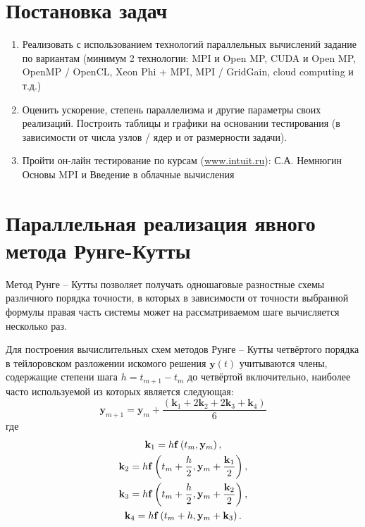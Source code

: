 \documentclass[14pt,final,titlepage,pscyr]{hedwork}
\renewcommand{\vec}[1]{\mathbf{#1}}
\begin{document}
\maketitle
\tableofcontents
\section{Постановка задач}
	\begin{enumerate}
		\item Реализовать с использованием технологий параллельных вычислений задание по вариантам 
			(минимум 2 технологии: MPI и Open MP, CUDA и Open MP, OpenMP / OpenCL, Xeon Phi + MPI, 
			MPI / GridGain, cloud computing и т.д.)
		\item Оценить ускорение, степень параллелизма и другие параметры своих реализаций. Построить 
			таблицы и графики на основании тестирования (в зависимости от числа узлов / ядер и от 
			размерности задачи).
		\item Пройти он-лайн тестирование по курсам (\url{www.intuit.ru}): С.А. Немнюгин Основы MPI и 
			Введение в облачные вычисления 
	\end{enumerate}
\section{Параллельная реализация явного метода Рунге-Кутты}
	Метод Рунге -- Кутты позволяет получать одношаговые разностные схемы различного порядка точности, в 
	которых в зависимости от точности выбранной формулы правая часть системы может на рассматриваемом шаге 
	вычисляется несколько раз.

	Для построения вычислительных схем методов Рунге -- Кутты четвёртого порядка в тейлоровском разложении 
	искомого решения \( \vec{y}(t) \) учитываются члены, содержащие степени шага \( h = t_{m+1} - t_m \) до 
	четвёртой включительно, наиболее часто используемой из которых является следующая:
	\begin{equation}
		\vec{y}_{m+1} = \vec{y}_m + \frac{\left( \vec{k}_1 + 2\vec{k}_2 + 2\vec{k}_3 + \vec{k}_4 \right)}{6}
		\label{eq8.9}
	\end{equation}
	где 
	\begin{gather}
		\vec{k}_1 = h\vec{f}\left(t_m, \vec{y}_m \right), \notag \\
		\vec{k}_2 = h\vec{f}\left(t_m + \frac{h}{2}, \vec{y}_m + \frac{\vec{k}_1}{2} \right), \notag \\
		\vec{k}_3 = h\vec{f}\left(t_m + \frac{h}{2}, \vec{y}_m + \frac{\vec{k}_2}{2} \right), \notag \\
		\vec{k}_4 = h\vec{f}\left(t_m + h, \vec{y}_m + \vec{k}_3 \right). \notag
	\end{gather}
\end{document}
